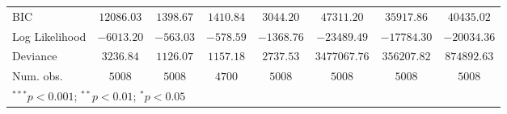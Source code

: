 \begin{tabular}{l c c c c c c c}
BIC                  & $12086.03$    & $1398.67$     & $1410.84$   & $3044.20$     & $47311.20$    & $35917.86$    & $40435.02$    \\
Log Likelihood       & $-6013.20$    & $-563.03$     & $-578.59$   & $-1368.76$    & $-23489.49$   & $-17784.30$   & $-20034.36$   \\
Deviance             & $3236.84$     & $1126.07$     & $1157.18$   & $2737.53$     & $3477067.76$  & $356207.82$   & $874892.63$   \\
Num. obs.            & $5008$        & $5008$        & $4700$      & $5008$        & $5008$        & $5008$        & $5008$        \\
\bottomrule
\multicolumn{8}{l}{\scriptsize{$^{***}p<0.001$; $^{**}p<0.01$; $^{*}p<0.05$}}
\end{tabular}
